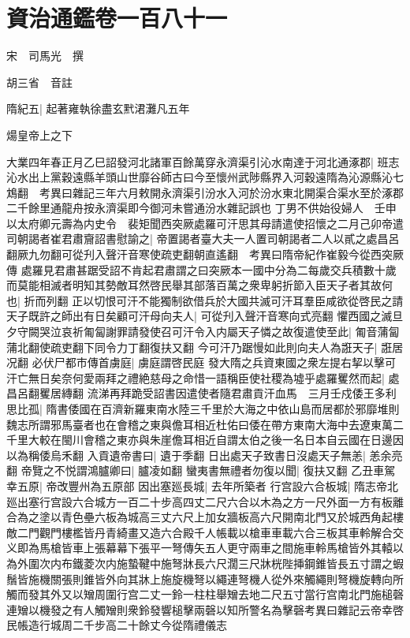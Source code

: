 \chapter{資治通鑑卷一百八十一}
宋　司馬光　撰

胡三省　音註

隋紀五|{
	起著雍執徐盡玄黓涒灘凡五年}


煬皇帝上之下

大業四年春正月乙巳詔發河北諸軍百餘萬穿永濟渠引沁水南達于河北通涿郡|{
	班志沁水出上黨穀遠縣羊頭山世靡谷師古曰今至懷州武陟縣界入河穀遠隋為沁源縣沁七鴆翻　考異曰雜記三年六月敕開永濟渠引汾水入河於汾水東北開渠合渠水至於涿郡二千餘里通龍舟按永濟渠即今御河未嘗通汾水雜記誤也}
丁男不供始役婦人　壬申以太府卿元壽為内史令　裴矩聞西突厥處羅可汗思其母請遣使招懷之二月己卯帝遣司朝謁者崔君肅齎詔書慰諭之|{
	帝置謁者臺大夫一人置司朝謁者二人以貳之處昌呂翻厥九勿翻可從刋入聲汗音寒使疏吏翻朝直遙翻　考異曰隋帝紀作崔毅今從西突厥傳}
處羅見君肅甚踞受詔不肯起君肅謂之曰突厥本一國中分為二每歲交兵積數十歲而莫能相滅者明知其勢敵耳然啓民舉其部落百萬之衆卑躬折節入臣天子者其故何也|{
	折而列翻}
正以切恨可汗不能獨制欲借兵於大國共滅可汗耳羣臣咸欲從啓民之請天子既許之師出有日矣顧可汗母向夫人|{
	可從刋入聲汗音寒向式亮翻}
懼西國之滅旦夕守闕哭泣哀祈匍匐謝罪請發使召可汗令入内屬天子憐之故復遣使至此|{
	匍音蒲匐蒲北翻使疏吏翻下同令力丁翻復扶又翻}
今可汗乃踞慢如此則向夫人為誑天子|{
	誑居况翻}
必伏尸都市傳首虜庭|{
	虜庭謂啓民庭}
發大隋之兵資東國之衆左提右挈以擊可汗亡無日矣奈何愛兩拜之禮絶慈母之命惜一語稱臣使社稷為墟乎處羅矍然而起|{
	處昌呂翻矍居縳翻}
流涕再拜跪受詔書因遣使者隨君肅貢汗血馬　三月壬戍倭王多利思比孤|{
	隋書倭國在百濟新羅東南水陸三千里於大海之中依山島而居都於邪靡堆則魏志所謂邪馬臺者也在會稽之東與儋耳相近杜佑曰倭在帶方東南大海中去遼東萬二千里大較在閩川會稽之東亦與朱崖儋耳相近自謂太伯之後一名日本自云國在日邊因以為稱倭烏禾翻}
入貢遺帝書曰|{
	遺于季翻}
日出處天子致書日沒處天子無恙|{
	恙余亮翻}
帝覽之不悦謂鴻臚卿曰|{
	臚凌如翻}
蠻夷書無禮者勿復以聞|{
	復扶又翻}
乙丑車駕幸五原|{
	帝改豐州為五原部}
因出塞廵長城|{
	去年所築者}
行宫設六合板城|{
	隋志帝北廵出塞行宫設六合城方一百二十步高四丈二尺六合以木為之方一尺外面一方有板離合為之塗以青色壘六板為城高三丈六尺上加女牆板高六尺開南北門又於城西角起樓敵二門觀門樓檻皆丹青綺畫又造六合殿千人帳載以槍車車載六合三板其車軨解合交义即為馬槍皆車上張幕幕下張平一弩傳矢五人更守兩車之間施車軨馬槍皆外其轅以為外圍次内布鐵菱次内施蟄鞬中施弩牀長六尺濶三尺牀桄陛挿鋼錐皆長五寸謂之蝦鬚皆施機關張則錐皆外向其牀上施旋機弩以繩連弩機人從外來觸繩則弩機旋轉向所觸而發其外又以矰周圍行宫二丈一鈴一柱柱舉矰去地二尺五寸當行宫南北門施槌磬連矰以機發之有人觸矰則衆鈴發響槌擊兩磬以知所警名為擊磬考異曰雜記云帝幸啓民帳造行城周二千步高二十餘丈今從隋禮儀志}
